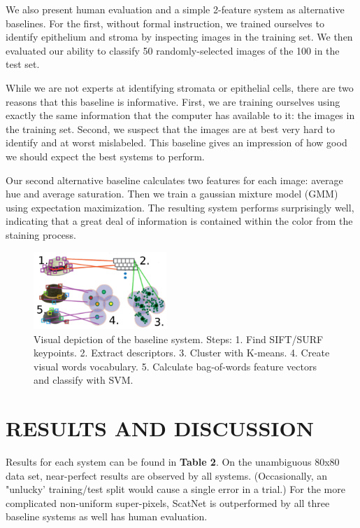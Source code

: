 \documentclass{article}
\begin{document}
We also present human evaluation and a simple 2-feature system as alternative
baselines. For the first, without formal instruction, we trained ourselves to
identify epithelium and stroma by inspecting images in the training set. We 
then evaluated our ability to classify 50 randomly-selected images of the 100 in
the test set.

While we are not experts at identifying stromata or epithelial cells, there are
two reasons that this baseline is informative. First, we are training ourselves
using exactly the same information that the computer has available to it: the
images in the training set. Second, we suspect that the images are at best very
hard to identify and at worst mislabeled. This baseline gives an impression of
how good we should expect the best systems to perform. 

Our second alternative baseline calculates two features for each image: average
hue and average saturation. Then we train a gaussian mixture model (GMM) using
expectation maximization. The resulting system performs surprisingly well,
indicating that a great deal of information is contained within the color
from the staining process.

\begin{figure}
	\centering
	\includegraphics[width=0.45\textwidth]{baseline-system}
	\caption{Visual depiction of the baseline system. Steps: 1. Find SIFT/SURF
	keypoints. 2. Extract descriptors. 3. Cluster with K-means. 4. Create visual words
	vocabulary. 5. Calculate bag-of-words feature vectors and classify with SVM.}
\end{figure}


\section{RESULTS AND DISCUSSION}
\label{sec:results}

Results for each system can be found in \textbf{Table 2}. On the unambiguous 80x80 data
set, near-perfect results are observed by all systems. (Occasionally, an "unlucky'
training/test split would cause a single error in a trial.)  For the more complicated
non-uniform super-pixels, ScatNet is outperformed by all three baseline systems as
well has human evaluation.
\end{document}

